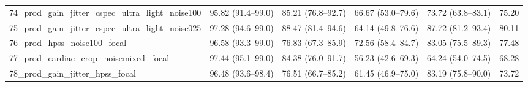 \documentclass[10pt]{article}
\begin{document}
\begin{longtable}{lccccr}
74\_prod\_gain\_jitter\_cspec\_ultra\_light\_noise100 & 95.82 (91.4--99.0) & 85.21 (76.8--92.7) & 66.67 (53.0--79.6) & 73.72 (63.8--83.1) & 75.20 \\
75\_prod\_gain\_jitter\_cspec\_ultra\_light\_noise025 & 97.28 (94.6--99.0) & 88.47 (81.4--94.6) & 64.14 (49.8--76.6) & 87.72 (81.2--93.4) & 80.11 \\
76\_prod\_hpss\_noise100\_focal & 96.58 (93.3--99.0) & 76.83 (67.3--85.9) & 72.56 (58.4--84.7) & 83.05 (75.5--89.3) & 77.48 \\
77\_prod\_cardiac\_crop\_noisemixed\_focal & 97.44 (95.1--99.0) & 84.38 (76.0--91.7) & 56.23 (42.6--69.3) & 64.24 (54.0--74.5) & 68.28 \\
78\_prod\_gain\_jitter\_hpss\_focal & 96.48 (93.6--98.4) & 76.51 (66.7--85.2) & 61.45 (46.9--75.0) & 83.19 (75.8--90.0) & 73.72 \\
\bottomrule
\end{longtable}
\end{document}
